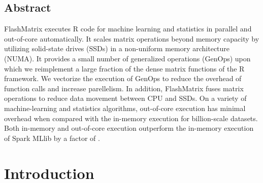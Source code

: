 \documentclass[letterpaper,twocolumn,10pt]{article}
\newcommand{\dz}[1]{{\color{blue}{\it DZ: #1}}}
\begin{document}
\subsection*{Abstract}
FlashMatrix executes R code for machine learning and statistics 
in parallel and out-of-core automatically.
%
%
%
It scales matrix operations
beyond memory capacity by utilizing solid-state drives (SSDs) in a non-uniform
memory architecture (NUMA). It provides a small number of generalized 
operations (GenOps) upon which we reimplement a large fraction of the dense 
matrix functions of the R framework.
We vectorize the execution of GenOps to reduce the overhead of function calls
and increase parellelism.
In addition, FlashMatrix fuses matrix operations to reduce data movement between CPU and
SSDs. 
On a variety of machine-learning and statistics algorithms, 
out-of-core execution has minimal overhead when compared with the in-memory execution
for billion-scale datasets.
Both in-memory and out-of-core execution outperform the in-memory execution of
Spark MLlib by a factor of \dz{3 to 30}.

\vspace{-10pt}
\section{Introduction}
\vspace{-5pt}


\vspace{-10pt}
\end{document}

